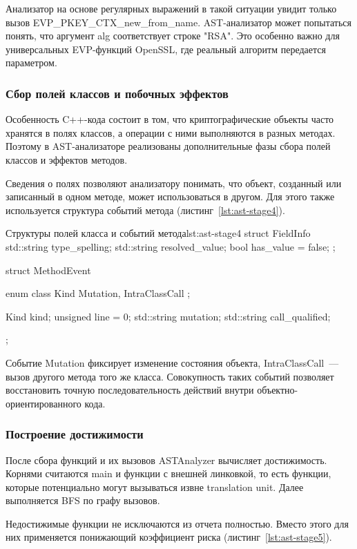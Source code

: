 \documentclass{itmo-vkr}
\begin{document}
Анализатор на основе регулярных выражений в такой ситуации увидит только вызов EVP\_PKEY\_CTX\_new\_from\_name. AST-анализатор может попытаться понять, что аргумент alg соответствует строке "RSA". Это особенно важно для универсальных EVP-функций OpenSSL, где реальный алгоритм передается параметром.

\subsubsection{Сбор полей классов и побочных эффектов}

Особенность C++-кода состоит в том, что криптографические объекты часто хранятся в полях классов, а операции с ними выполняются в разных методах. Поэтому в AST-анализаторе реализованы дополнительные фазы сбора полей классов и эффектов методов.

Сведения о полях позволяют анализатору понимать, что объект, созданный или записанный в одном методе, может использоваться в другом. Для этого также используется структура событий метода (листинг~\ref{lst:ast-stage4}).

\begin{itmolisting}[C++]{Структуры полей класса и событий метода}{lst:ast-stage4}
struct FieldInfo {
	std::string type_spelling;
	std::string resolved_value;
	bool has_value = false;
};

struct MethodEvent {
	enum class Kind {
		Mutation,
		IntraClassCall
	};
	
	Kind kind;
	unsigned line = 0;
	std::string mutation;
	std::string call_qualified;
};
\end{itmolisting}

Событие Mutation фиксирует изменение состояния объекта, IntraClassCall~--- вызов другого метода того же класса. Совокупность таких событий позволяет восстановить точную последовательность действий внутри объектно-ориентированного кода.
	
\subsubsection{Построение достижимости}

После сбора функций и их вызовов ASTAnalyzer вычисляет достижимость. Корнями считаются main и функции с внешней линковкой, то есть функции, которые потенциально могут вызываться извне translation unit. Далее выполняется BFS по графу вызовов.

Недостижимые функции не исключаются из отчета полностью. Вместо этого для них применяется понижающий коэффициент риска (листинг~\ref{lst:ast-stage5}).
\end{document}
